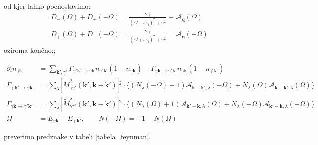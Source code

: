 \documentclass[a4paper,10pt]{article}
\renewcommand{\vec}[1]{\mathbf{#1}}
\begin{document}
od kjer lahko poenostavimo: 
\begin{align}
  D_-(\Omega) + D_+(-\Omega) = \frac{2\gamma}{(\Omega - \omega_{\vec{q}})^2 + \gamma^2} \equiv \mathcal{A}_{\vec q}(\Omega) \\
  D_+(\Omega) + D_-(-\Omega) = \frac{2\gamma}{(\Omega + \omega_{\vec{q}})^2 + \gamma^2} = \mathcal{A}_{\vec q}(-\Omega) 
\end{align}
oziroma končno:; 
\begin{tcolorbox}
\begin{align}
\partial_t {n}_{\gamma \vec{k}} &= \sum_{\vec{k}', \gamma'} \Gamma_{\gamma' \vec{k}' \to \gamma \vec{k}} n_{\gamma' \vec{k}'} (1 - n_{\gamma \vec{k}}) - \Gamma_{\gamma \vec{k} \to \gamma' \vec{k}'} n_{\gamma \vec{k}} (1 - n_{\gamma' \vec{k}'}) \\ \Gamma_{\gamma' \vec{k}' \to \gamma \vec{k}} &= \sum_{\lambda} \left\vert{} \tilde{M}^{\lambda}_{\gamma \gamma'}(\vec{k}', \vec{k} -\vec{k}') \right\vert{}^2 \cdot \Big\{ (N_\lambda(-\Omega) + 1) \mathcal{A}_{\vec{k}-\vec{k}', \lambda}(-\Omega) + N_\lambda(\Omega) \mathcal{A}_{\vec{k}-\vec{k}', \lambda}(\Omega) \Big\} \\ \Gamma_{\gamma \vec{k} \to \gamma' \vec{k}'} &= \sum_{\lambda} \left\vert{} \tilde{M}^{\lambda}_{\gamma \gamma'}(\vec{k}', \vec{k} - \vec{k}') \right\vert{}^2 \cdot \Big\{ (N_\lambda(\Omega) + 1) \mathcal{A}_{\vec{k}'-\vec{k}, \lambda}(\Omega) + N_\lambda(-\Omega) \mathcal{A}_{\vec{k}'-\vec{k}, \lambda}(-\Omega) \Big\} \\ \Omega &= E_{\gamma \vec{k}} - E_{\gamma' \vec{k}'}, \qquad N(-\Omega) = -1 - N(\Omega)
\end{align}
\end{tcolorbox} \noindent
preverimo predznake v tabeli \ref{tabela_feynman}.
\end{document}
